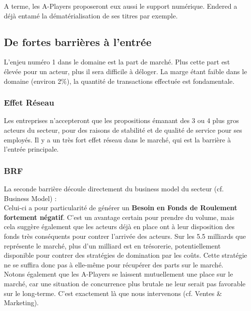 A terme, les A-Players proposeront eux aussi le support numérique. Endered a
déjà entamé la dématérialisation de ses titres par exemple. \\

\subsection{De fortes barrières à l’entrée}
L’enjeu numéro 1 dans le domaine est la part de marché. Plus cette part est
élevée pour un acteur, plus il sera difficile à déloger. La marge étant faible
dans le domaine (environ 2\%), la quantité de transactions effectuée est
fondamentale. \\

\subsubsection{Effet Réseau}
Les entreprises n’accepteront que les propositions émanant des 3 ou 4 plus gros
acteurs du secteur, pour des raisons de stabilité et de qualité de service pour
ses employés. Il y a un très fort effet réseau dans le marché, qui est la
barrière à l’entrée principale. \\

\subsubsection{BRF}
La seconde barrière découle directement du business model du secteur (cf.
Business Model) : \\

Celui-ci a pour particularité de générer un \textbf{Besoin en Fonds de
Roulement fortement négatif}. C’est un avantage certain pour prendre du volume,
mais cela suggère également que les acteurs déjà en place ont à leur
disposition des fonds très conséquents pour contrer l’arrivée des acteurs. Sur
les 5.5 milliards que représente le marché, plus d’un milliard est en
trésorerie, potentiellement disponible pour contrer des stratégies de
domination par les coûts. Cette stratégie ne se suffira donc pas à elle-même
pour récupérer des parts sur le marché. \\

Notons également que les A-Players se laissent mutuellement une place sur le
marché, car une situation de concurrence plus brutale ne leur serait pas
favorable sur le long-terme. C’est exactement là que nous intervenons (cf.
Ventes \& Marketing). \\

